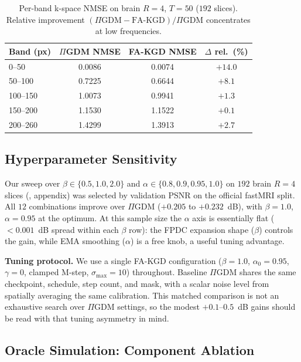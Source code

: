 \documentclass[10pt,twocolumn,letterpaper]{article}
\newcommand{\PIGDM}{$\Pi$GDM}
\begin{document}
\begin{table}[H]
\centering
\caption{Per-band k-space NMSE on brain $R{=}4$, $T{=}50$ ($192$ slices).
Relative improvement $(\Pi\text{GDM}{-}\text{FA-KGD})/\Pi\text{GDM}$ concentrates
at low frequencies.}
\label{tab:freq}
\setlength{\tabcolsep}{5pt}
\small
\begin{tabular}{@{}l c c c@{}}
\toprule
Band (px) & $\Pi$GDM NMSE & FA-KGD NMSE & $\Delta$ rel.\ (\%) \\
\midrule
0--50    & 0.0086 & 0.0074 & $\mathbf{+14.0}$ \\
50--100  & 0.7225 & 0.6644 & $\mathbf{+8.1}$ \\
100--150 & 1.0073 & 0.9941 & $+1.3$ \\
150--200 & 1.1530 & 1.1522 & $+0.1$ \\
200--260 & 1.4299 & 1.3913 & $+2.7$ \\
\bottomrule
\end{tabular}
\end{table}

\subsection{Hyperparameter Sensitivity}

Our sweep over $\beta \in \{0.5, 1.0, 2.0\}$ and
$\alpha \in \{0.8, 0.9, 0.95, 1.0\}$ on $192$ brain $R{=}4$ slices
(, appendix) was selected by validation PSNR on the official
fastMRI split. All $12$ combinations improve over \PIGDM{} ($+0.205$ to $+0.232$~dB), with
$\beta{=}1.0$, $\alpha{=}0.95$ at the optimum. At this sample size the $\alpha$ axis is essentially flat
($<0.001$~dB spread within each $\beta$ row): the FPDC expansion shape
($\beta$) controls the gain, while EMA smoothing ($\alpha$) is a free knob, a
useful tuning advantage.

\textbf{Tuning protocol.} We use a single FA-KGD configuration
($\beta{=}1.0$, $\alpha_0{=}0.95$, $\gamma{=}0$, clamped M-step,
$\sigma_{\max}{=}10$) throughout. Baseline $\Pi$GDM shares the same checkpoint,
schedule, step count, and mask, with a scalar noise level from spatially
averaging the same calibration. This matched comparison is not an exhaustive
search over $\Pi$GDM settings, so the modest $+0.1$--$0.5$~dB gains should be
read with that tuning asymmetry in mind.

\subsection{Oracle Simulation: Component Ablation}
\label{sec:ablation}
\end{document}

